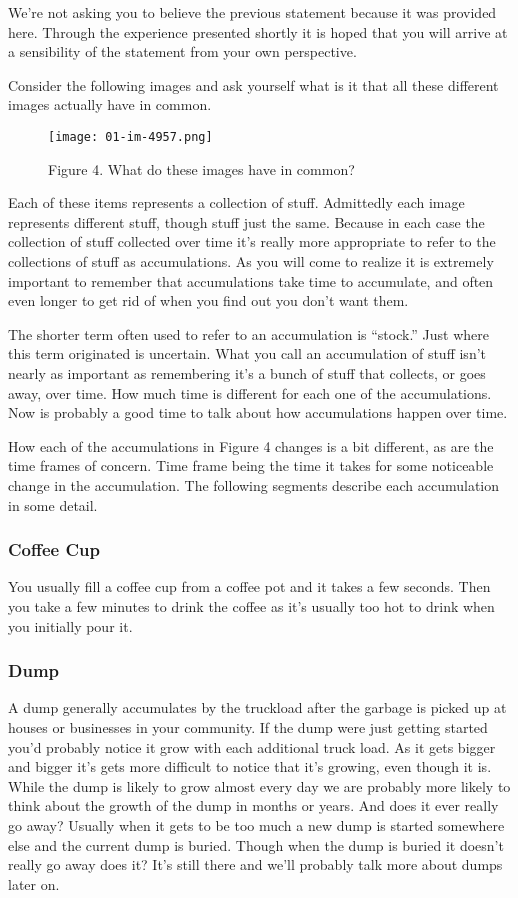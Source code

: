 \documentclass[]{memoir}
\let\Oldincludegraphics\includegraphics
\renewcommand{\includegraphics}[1]{\Oldincludegraphics[max size={\textwidth}{\textheight}]{#1}}
\begin{document}
We're not asking you to believe the previous statement because it was
provided here. Through the experience presented shortly it is hoped that
you will arrive at a sensibility of the statement from your own
perspective.

Consider the following images and ask yourself what is it that all these
different images actually have in common.

\begin{figure}[htbp]
\centering
\texttt{[image: 01-im-4957.png]}
\caption{Figure 4. What do these images have in common?}
\end{figure}

Each of these items represents a collection of stuff. Admittedly each
image represents different stuff, though stuff just the same. Because in
each case the collection of stuff collected over time it's really more
appropriate to refer to the collections of stuff as accumulations. As
you will come to realize it is extremely important to remember that
accumulations take time to accumulate, and often even longer to get rid
of when you find out you don't want them.

The shorter term often used to refer to an accumulation is ``stock.''
Just where this term originated is uncertain. What you call an
accumulation of stuff isn't nearly as important as remembering it's a
bunch of stuff that collects, or goes away, over time. How much time is
different for each one of the accumulations. Now is probably a good time
to talk about how accumulations happen over time.

How each of the accumulations in Figure 4 changes is a bit different, as
are the time frames of concern. Time frame being the time it takes for
some noticeable change in the accumulation. The following segments
describe each accumulation in some detail.

\subsubsection{Coffee Cup}

You usually fill a coffee cup from a coffee pot and it takes a few
seconds. Then you take a few minutes to drink the coffee as it's usually
too hot to drink when you initially pour it.

\subsubsection{Dump}

A dump generally accumulates by the truckload after the garbage is
picked up at houses or businesses in your community. If the dump were
just getting started you'd probably notice it grow with each additional
truck load. As it gets bigger and bigger it's gets more difficult to
notice that it's growing, even though it is. While the dump is likely to
grow almost every day we are probably more likely to think about the
growth of the dump in months or years. And does it ever really go away?
Usually when it gets to be too much a new dump is started somewhere else
and the current dump is buried. Though when the dump is buried it
doesn't really go away does it? It's still there and we'll probably talk
more about dumps later on.
\end{document}
